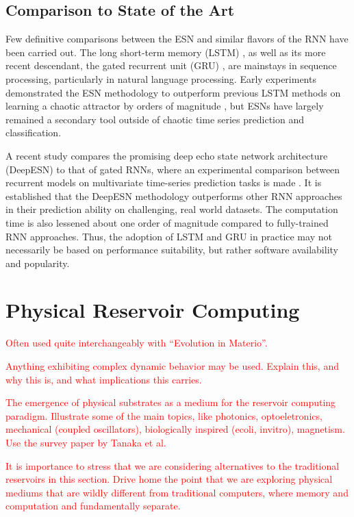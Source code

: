 \subsection{Comparison to State of the Art}

Few definitive comparisons between the ESN and similar flavors of the RNN have
been carried out. The long short-term memory (LSTM) \cite{hochreiter_long_1997},
as well as its more recent descendant, the gated recurrent unit (GRU)
\cite{cho_learning_2014}, are mainstays in sequence processing, particularly in
natural language processing. Early experiments demonstrated the ESN methodology
to outperform previous LSTM methods on learning a chaotic attractor by orders of
magnitude \cite{jaeger_echo_2001}, but ESNs have largely remained a secondary
tool outside of chaotic time series prediction and classification.

A recent study compares the promising deep echo state network architecture
(DeepESN) to that of gated RNNs, where an experimental comparison between
recurrent models on multivariate time-series prediction tasks is made
\cite{gallicchio_comparison_2019}. It is established that the DeepESN
methodology outperforms other RNN approaches in their prediction ability on
challenging, real world datasets. The computation time is also lessened about
one order of magnitude compared to fully-trained RNN approaches. Thus, the
adoption of LSTM and GRU in practice may not necessarily be based on performance
suitability, but rather software availability and popularity.

\section{Physical Reservoir Computing}

\textcolor{red}{
  Often used quite interchangeably with ``Evolution in Materio''.
}

\textcolor{red}{
  Anything exhibiting complex dynamic behavior may be used. Explain this, and
why this is, and what implications this carries.
}

\textcolor{red}{
  The emergence of physical substrates as a medium for the reservoir computing
paradigm. Illustrate some of the main topics, like photonics, optoeletronics,
mechanical (coupled oscillators), biologically inspired (ecoli, invitro),
magnetism. Use the survey paper by Tanaka et al.
}

\textcolor{red}{
  It is importance to stress that we are considering alternatives to the
traditional reservoirs in this section. Drive home the point that we are
exploring physical mediums that are wildly different from traditional computers,
where memory and computation and fundamentally separate.
}

